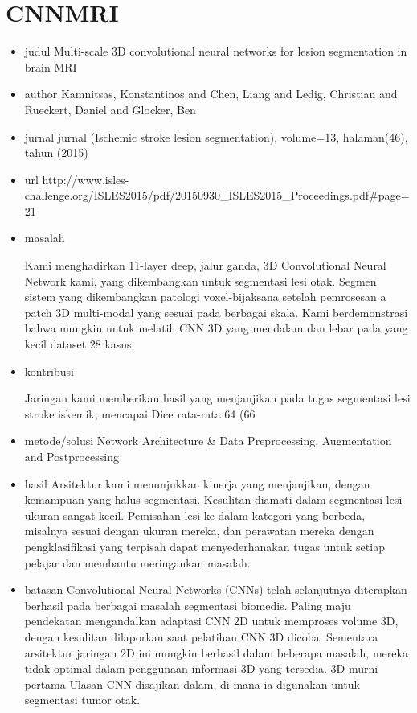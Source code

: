 \section{CNNMRI}
\begin{itemize}

\item judul
Multi-scale 3D convolutional neural networks for lesion segmentation in brain MRI

\item author
Kamnitsas, Konstantinos and Chen, Liang and Ledig, Christian and Rueckert, Daniel and Glocker, Ben

\item jurnal
jurnal (Ischemic stroke lesion segmentation), volume=13, halaman(46), tahun (2015)

\item url 
http://www.isles-challenge.org/ISLES2015/pdf/20150930_ISLES2015_Proceedings.pdf#page=21

\item masalah

Kami menghadirkan 11-layer deep, jalur ganda, 3D Convolutional Neural Network kami, yang dikembangkan untuk segmentasi lesi otak.
Segmen sistem yang dikembangkan patologi voxel-bijaksana setelah pemrosesan a
patch 3D multi-modal yang sesuai pada berbagai skala. Kami berdemonstrasi
bahwa mungkin untuk melatih CNN 3D yang mendalam dan lebar pada yang kecil
dataset 28 kasus.

\item kontribusi

Jaringan kami memberikan hasil yang menjanjikan pada tugas
segmentasi lesi stroke iskemik, mencapai Dice rata-rata 64%
(66%

\item metode/solusi
Network Architecture & Data Preprocessing, Augmentation and Postprocessing

\item hasil
Arsitektur kami menunjukkan kinerja yang menjanjikan, dengan kemampuan yang halus
segmentasi. Kesulitan diamati dalam segmentasi lesi ukuran sangat kecil. Pemisahan lesi ke dalam kategori yang berbeda, misalnya
sesuai dengan ukuran mereka, dan perawatan mereka dengan pengklasifikasi yang terpisah dapat menyederhanakan
tugas untuk setiap pelajar dan membantu meringankan masalah.

\item batasan
Convolutional Neural Networks (CNNs) telah selanjutnya diterapkan
berhasil pada berbagai masalah segmentasi biomedis. Paling maju
pendekatan mengandalkan adaptasi CNN 2D untuk memproses volume 3D, dengan kesulitan dilaporkan saat pelatihan CNN 3D dicoba.
Sementara arsitektur jaringan 2D ini mungkin berhasil dalam beberapa masalah,
mereka tidak optimal dalam penggunaan informasi 3D yang tersedia. 3D murni pertama
Ulasan CNN disajikan dalam, di mana ia digunakan untuk segmentasi tumor otak.
\end{itemize}